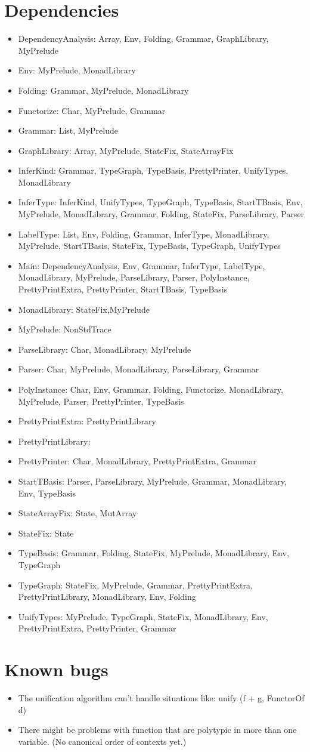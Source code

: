 \section{Dependencies}
\begin{itemize} 
\item DependencyAnalysis: Array, Env, Folding, Grammar, GraphLibrary,
  MyPrelude
\item Env: MyPrelude, MonadLibrary
\item Folding: Grammar, MyPrelude, MonadLibrary
\item Functorize: Char, MyPrelude, Grammar
\item Grammar: List, MyPrelude
\item GraphLibrary: Array, MyPrelude, StateFix, StateArrayFix
\item InferKind: Grammar, TypeGraph, TypeBasis, PrettyPrinter,
  UnifyTypes, MonadLibrary
\item InferType: InferKind, UnifyTypes, TypeGraph, TypeBasis,
  StartTBasis, Env, MyPrelude, MonadLibrary, Grammar, Folding,
  StateFix, ParseLibrary, Parser
\item LabelType: List, Env, Folding, Grammar, InferType, MonadLibrary,
  MyPrelude, StartTBasis, StateFix, TypeBasis, TypeGraph, UnifyTypes
\item Main: DependencyAnalysis, Env, Grammar, InferType, LabelType,
  MonadLibrary, MyPrelude, ParseLibrary, Parser, PolyInstance,
  PrettyPrintExtra, PrettyPrinter, StartTBasis, TypeBasis
\item MonadLibrary: StateFix,MyPrelude
\item MyPrelude: NonStdTrace
\item ParseLibrary: Char, MonadLibrary, MyPrelude
\item Parser: Char, MyPrelude, MonadLibrary, ParseLibrary, Grammar
\item PolyInstance: Char, Env, Grammar, Folding, Functorize,
  MonadLibrary, MyPrelude, Parser, PrettyPrinter, TypeBasis
\item PrettyPrintExtra: PrettyPrintLibrary
\item PrettyPrintLibrary: 
\item PrettyPrinter: Char, MonadLibrary, PrettyPrintExtra, Grammar
\item StartTBasis: Parser, ParseLibrary, MyPrelude, Grammar,
  MonadLibrary, Env, TypeBasis
\item StateArrayFix: State, MutArray
\item StateFix: State
\item TypeBasis: Grammar, Folding, StateFix, MyPrelude, MonadLibrary,
  Env, TypeGraph
\item TypeGraph: StateFix, MyPrelude, Grammar, PrettyPrintExtra,
  PrettyPrintLibrary, MonadLibrary, Env, Folding
\item UnifyTypes: MyPrelude, TypeGraph, StateFix, MonadLibrary, Env,
  PrettyPrintExtra, PrettyPrinter, Grammar
\end{itemize}
\section{Known bugs}
\begin{itemize}
\item The unification algorithm can't handle situations like: unify (f
  + g, FunctorOf d)
\item There might be problems with function that are polytypic in more
  than one variable. (No canonical order of contexts yet.)
\end{itemize}

